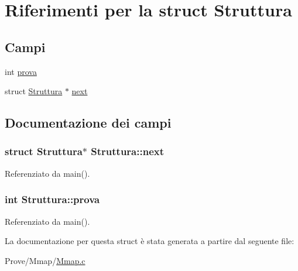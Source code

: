 \hypertarget{structStruttura}{}\section{Riferimenti per la struct Struttura}
\label{structStruttura}
\subsection*{Campi}
\begin{DoxyCompactItemize}
\item 
int \hyperlink{structStruttura_a6bed68a71bad8da4f22e93def9c759af}{prova}
\item 
struct \hyperlink{structStruttura}{Struttura} $\ast$ \hyperlink{structStruttura_a2694fc2200e10bf8dcdc32bf7d8b9642}{next}
\end{DoxyCompactItemize}


\subsection{Documentazione dei campi}
\hypertarget{structStruttura_a2694fc2200e10bf8dcdc32bf7d8b9642}{}
\subsubsection[{next}]{\setlength{\rightskip}{0pt plus 5cm}struct {\bf Struttura}$\ast$ Struttura\+::next}\label{structStruttura_a2694fc2200e10bf8dcdc32bf7d8b9642}


Referenziato da main().

\hypertarget{structStruttura_a6bed68a71bad8da4f22e93def9c759af}{}
\subsubsection[{prova}]{\setlength{\rightskip}{0pt plus 5cm}int Struttura\+::prova}\label{structStruttura_a6bed68a71bad8da4f22e93def9c759af}


Referenziato da main().



La documentazione per questa struct è stata generata a partire dal seguente file\+:\begin{DoxyCompactItemize}
\item 
Prove/\+Mmap/\hyperlink{Mmap_8c}{Mmap.\+c}\end{DoxyCompactItemize}

